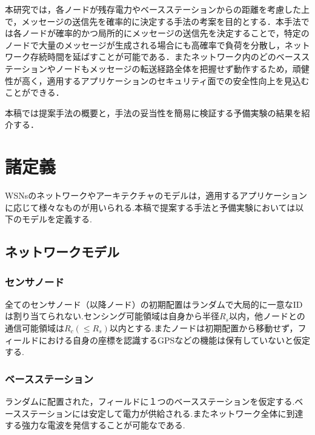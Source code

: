 \documentclass[a4j,10pt]{jarticle}
\begin{document}
本研究では，各ノードが残存電力やベースステーションからの距離を考慮した上で，メッセージの送信先を確率的に決定する手法の考案を目的とする．本手法では各ノードが確率的かつ局所的にメッセージの送信先を決定することで，特定のノードで大量のメッセージが生成される場合にも高確率で負荷を分散し，ネットワーク存続時間を延ばすことが可能である．またネットワーク内のどのベースステーションやノードもメッセージの転送経路全体を把握せず動作するため，頑健性が高く，適用するアプリケーションのセキュリティ面での安全性向上を見込むことができる．

本稿では提案手法の概要と，手法の妥当性を簡易に検証する予備実験の結果を紹介する．




\section{諸定義}
WSNsのネットワークやアーキテクチャのモデルは，適用するアプリケーションに応じて様々なものが用いられる.本稿で提案する手法と予備実験においては以下のモデルを定義する.

\subsection{ネットワークモデル}

\subsubsection{センサノード}
全てのセンサノード（以降ノード）の初期配置はランダムで大局的に一意なIDは割り当てられない.センシング可能領域は自身から半径$R_s$以内，他ノードとの通信可能領域は$R_c(\le R_s)$以内とする.またノードは初期配置から移動せず，フィールドにおける自身の座標を認識するGPSなどの機能は保有していないと仮定する.

\subsubsection{ベースステーション}
ランダムに配置された，フィールドに１つのベースステーションを仮定する.ベースステーションには安定して電力が供給される.またネットワーク全体に到達する強力な電波を発信することが可能なである.
\end{document}
